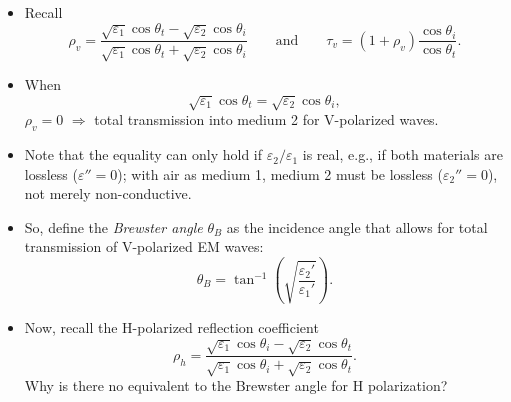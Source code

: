 \documentclass[11pt, oneside]{article}
\begin{document}
\begin{itemize}
	\item Recall
	\begin{equation}
		\rho_v = \frac{\sqrt{\varepsilon_1}\cos\theta_t - \sqrt{\varepsilon_2}\cos\theta_i}{\sqrt{\varepsilon_1}\cos\theta_t + \sqrt{\varepsilon_2}\cos\theta_i}
		\qquad \text{and} \qquad
		\tau_v = \left(1 + \rho_v\right)\frac{\cos\theta_i}{\cos\theta_t}.
	\end{equation}
	\item When
	\begin{equation}
		\sqrt{\varepsilon_1}\cos\theta_t = \sqrt{\varepsilon_2}\cos\theta_i,
	\end{equation}
	$\rho_v = 0$ $\Rightarrow$ total transmission into medium 2 for V-polarized waves.
	\item Note that the equality can only hold if $\varepsilon_2/\varepsilon_1$ is real, e.g., if both materials are lossless ($\varepsilon'' = 0$); with air as medium 1, medium 2 must be lossless ($\varepsilon_2'' = 0$), not merely non-conductive.
	\item So, define the \emph{Brewster angle} $\theta_B$ as the incidence angle that allows for total transmission of V-polarized EM waves:
	\begin{equation}
		\theta_B = \tan^{-1}\left(\sqrt{\frac{\varepsilon_2'}{\varepsilon_1'}}\right).
	\end{equation}
	\item Now, recall the H-polarized reflection coefficient
	\begin{equation}
		\rho_h = \frac{\sqrt{\varepsilon_1}\cos\theta_i - \sqrt{\varepsilon_2}\cos\theta_t}{\sqrt{\varepsilon_1}\cos\theta_i + \sqrt{\varepsilon_2}\cos\theta_t}.
	\end{equation}
	Why is there no equivalent to the Brewster angle for H polarization?
\end{itemize}
\end{document}
